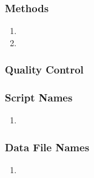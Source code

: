 \subsubsection*{Methods}
\begin{enumerate}
\item 
\item
\end{enumerate}
\subsubsection*{Quality Control}
\subsubsection*{Script Names}
\begin{enumerate}
\item 
\end{enumerate}
\subsubsection*{Data File Names}
\begin{enumerate}
\item 
\end{enumerate} 